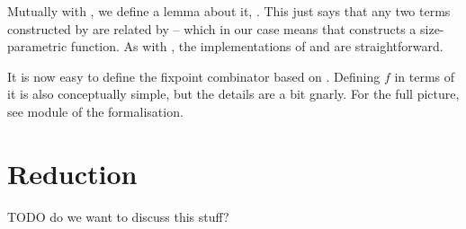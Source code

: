 Mutually with , we define a lemma about it,
. This just says that any two terms constructed by
 are related by  -- which in our case means that
 constructs a size-parametric function. As with
, the implementations of  and
 are straightforward.

It is now easy to define the fixpoint combinator  based on
. Defining $f$ in terms of it is also conceptually simple, but
the details are a bit gnarly. For the full picture, see module
 of the formalisation.


\section{Reduction}
\label{sec:formalisation:reduction}

TODO do we want to discuss this stuff?
